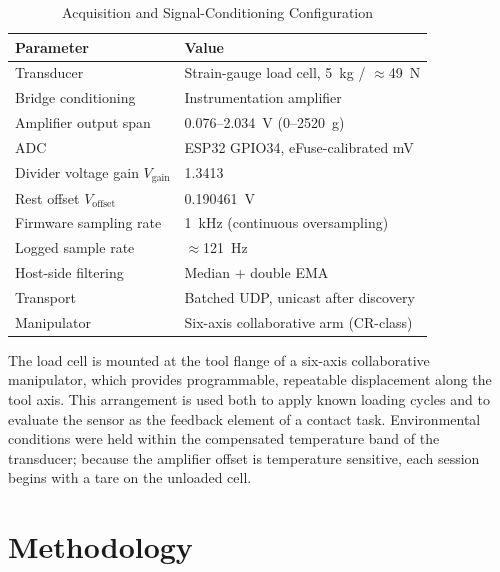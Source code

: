 \documentclass[conference]{IEEEtran}
\begin{document}
\begin{table}[htbp]
\caption{Acquisition and Signal-Conditioning Configuration}
\begin{center}
\begin{tabular}{|l|l|}
\hline
\textbf{Parameter} & \textbf{Value} \\
\hline
Transducer & Strain-gauge load cell, 5~kg / $\approx$49~N \\
\hline
Bridge conditioning & Instrumentation amplifier \\
\hline
Amplifier output span & 0.076--2.034~V (0--2520~g) \\
\hline
ADC & ESP32 GPIO34, eFuse-calibrated mV \\
\hline
Divider voltage gain $V_{\mathrm{gain}}$ & 1.3413 \\
\hline
Rest offset $V_{\mathrm{offset}}$ & 0.190461~V \\
\hline
Firmware sampling rate & 1~kHz (continuous oversampling) \\
\hline
Logged sample rate & $\approx$121~Hz \\
\hline
Host-side filtering & Median + double EMA \\
\hline
Transport & Batched UDP, unicast after discovery \\
\hline
Manipulator & Six-axis collaborative arm (CR-class) \\
\hline
\end{tabular}
\label{tab:config}
\end{center}
\end{table}

The load cell is mounted at the tool flange of a six-axis collaborative manipulator, which provides programmable, repeatable displacement along the tool axis. This arrangement is used both to apply known loading cycles and to evaluate the sensor as the feedback element of a contact task. Environmental conditions were held within the compensated temperature band of the transducer; because the amplifier offset is temperature sensitive, each session begins with a tare on the unloaded cell.

\section{Methodology}\label{sec:method}
\end{document}

